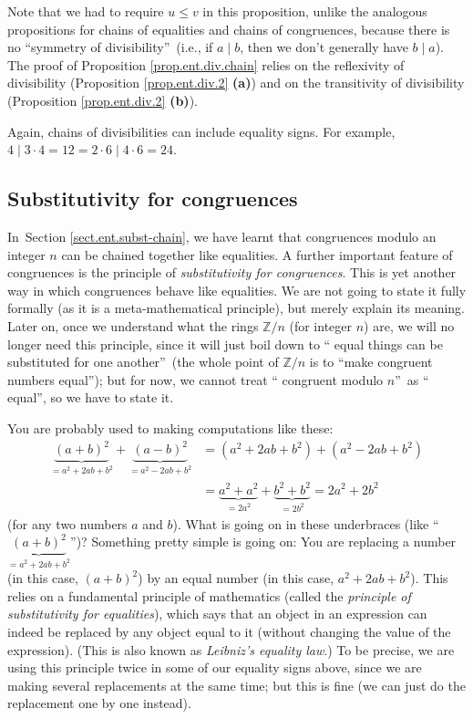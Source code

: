 \documentclass[numbers=enddot,12pt,final,onecolumn,notitlepage]{scrartcl}%
\numberwithin{exer}{subsection}
\theoremstyle{definition}
\begin{document}
Note that we had to require $u\leq v$ in this proposition, unlike the
analogous propositions for chains of equalities and chains of congruences,
because there is no \textquotedblleft symmetry of
divisibility\textquotedblright\ (i.e., if $a\mid b$, then we don't generally
have $b\mid a$). The proof of Proposition \ref{prop.ent.div.chain} relies on
the reflexivity of divisibility (Proposition \ref{prop.ent.div.2}
\textbf{(a)}) and on the transitivity of divisibility (Proposition
\ref{prop.ent.div.2} \textbf{(b)}).

Again, chains of divisibilities can include equality signs. For example,
$4\mid3\cdot4=12=2\cdot6\mid4\cdot6=24$.

\subsection{\label{sect.ent.subst-mod}Substitutivity for congruences}

In\ Section \ref{sect.ent.subst-chain}, we have learnt that congruences modulo
an integer $n$ can be chained together like equalities. A further important
feature of congruences is the principle of \textit{substitutivity for
congruences}. This is yet another way in which congruences behave like
equalities. We are not going to state it fully formally (as it is a
meta-mathematical principle), but merely explain its meaning. Later on, once
we understand what the rings $\mathbb{Z}/n$ (for integer $n$) are, we will no
longer need this principle, since it will just boil down to \textquotedblleft
equal things can be substituted for one another\textquotedblright\ (the whole
point of $\mathbb{Z}/n$ is to \textquotedblleft make congruent numbers
equal\textquotedblright); but for now, we cannot treat \textquotedblleft
congruent modulo $n$\textquotedblright\ as \textquotedblleft
equal\textquotedblright, so we have to state it.

You are probably used to making computations like these:%
\begin{align*}
\underbrace{\left(  a+b\right)  ^{2}}_{=a^{2}+2ab+b^{2}}+\underbrace{\left(
a-b\right)  ^{2}}_{=a^{2}-2ab+b^{2}}  &  =\left(  a^{2}+2ab+b^{2}\right)
+\left(  a^{2}-2ab+b^{2}\right) \\
&  =\underbrace{a^{2}+a^{2}}_{=2a^{2}}+\underbrace{b^{2}+b^{2}}_{=2b^{2}%
}=2a^{2}+2b^{2}%
\end{align*}
(for any two numbers $a$ and $b$). What is going on in these underbraces (like
\textquotedblleft$\underbrace{\left(  a+b\right)  ^{2}}_{=a^{2}+2ab+b^{2}}%
$\textquotedblright)? Something pretty simple is going on: You are replacing a
number (in this case, $\left(  a+b\right)  ^{2}$) by an equal number (in this
case, $a^{2}+2ab+b^{2}$). This relies on a fundamental principle of
mathematics (called the \textit{principle of substitutivity for equalities}),
which says that an object in an expression can indeed be replaced by any
object equal to it (without changing the value of the expression). (This is
also known as \textit{Leibniz's equality law}.) To be precise, we are using
this principle twice in some of our equality signs above, since we are making
several replacements at the same time; but this is fine (we can just do the
replacement one by one instead).
\end{document}
